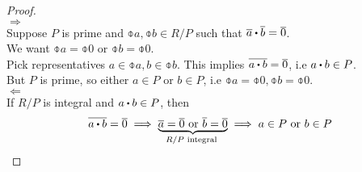 \documentclass[../Main.tex]{subfiles}
\begin{document}
\begin{proof}~\\
	$\Rightarrow$\\
	Suppose $P$ is prime and  $\obar{a},\obar{b}\in R/P$ such that $\obar{a}\rdot \obar{b}=\obar{0}$.\\
	We want $\obar{a}=\obar{0}$ or $\obar{b}=\obar{0}$.\\
	Pick representatives $a\in \obar{a}, b\in \obar{b}$. This implies $\obar{a\rdot  b} = \obar{0}$, i.e $a\rdot b \in P$.\\
	But $P$ is prime, so either $a\in P$ or $b \in P$, i.e $\obar{a}=\obar{0},\obar{b}=\obar{0}$.\\
	$\Leftarrow$\\
	If $R/P$ is integral and $a\rdot b\in P$, then
	\[\obar{a\rdot b}=\obar{0}\implies \underbrace{\obar{a}=\obar{0} \text{ or } \obar{b} = \obar{0}}_{R/P \text{ integral }} \implies a\in P \text{ or } b \in P\]
\end{proof}
\end{document}
